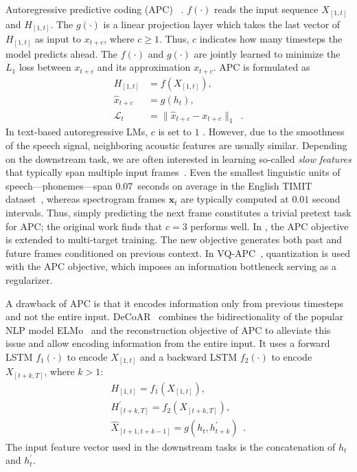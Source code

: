 Autoregressive predictive coding (APC)~\parencite{chung_unsupervised_2019,
chung_generative_2020} .
 $f(\cdot)$ reads the input sequence $X_{[1,t]}$ and  $H_{[1,t]}$.
The  $g(\cdot)$ is a linear projection layer which takes the last vector of $H_{[1,t]}$ as input to  $x_{t+c}$, where $c \geq 1$. Thus, $c$ indicates how many timesteps the model predicts ahead. The  $f(\cdot)$
and $g(\cdot)$ are jointly learned to minimize {the \ensuremath{L_1} loss between $x_{t+c}$ and its approximation $\hat{x}_{t+c}$}. APC is formulated as 
\begin{align}
    H_{[1,t]} &= f(X_{[1,t]}) , \\
    \hat{x}_{t+c} &= g(h_{t}) \label{eq:c} , \\
    \mathcal{L}_t &= \lVert \hat{x}_{t+c} - x_{t+c} \rVert_1 \enspace .
\end{align}
In text-based autoregressive LMs, $c$ is set to $1$ . However, due to the smoothness of the speech signal, neighboring acoustic features are usually similar. Depending on the downstream task, we are often interested in learning so-called \emph{slow features} that typically span multiple input frames~\parencite{wiskott_slow_2002}. Even the smallest linguistic units of speech---phonemes---span $0.07$~seconds on average in the English TIMIT dataset~\parencite{garofolo_timit_1993},   whereas spectrogram frames $\mathbf{x}_t$ are typically computed at $0.01$ second intervals. Thus, simply predicting the next frame constitutes a trivial pretext task for APC; the original work finds that $c=3$ performs well. 
In \parencite{chung_improved_2020}, the APC objective is extended to multi-target
training. The new objective generates both past and future frames conditioned
on previous context. 
In VQ-APC~\parencite{chung_vectorquantized_2020}, quantization is used with the APC
objective, which imposes an information bottleneck serving as a regularizer.

A drawback of APC is that it encodes information only from previous timesteps
and not the entire input.
DeCoAR~\parencite{ling_deep_2020} combines the bidirectionality of the popular NLP model
ELMo~\parencite{peters_deep_2018} and the reconstruction objective of APC to alleviate
this issue and allow encoding information from the entire input. 
It uses a forward LSTM $f_1(\cdot)$ to encode $X_{[1,t]}$ and a backward LSTM
$f_2(\cdot)$ to encode $X_{[t+k,T]}$, where $k>1$: 
\begin{gather}
    H_{[1,t]} = f_1(X_{[1,t]}), \\
    H^\prime_{[t+k,T]} = f_2(X_{[t+k,T]}), \\
    \hat{X}_{[t+1,t+k-1]} = g(h_t, h^\prime_{t+k}) \enspace .
\end{gather}
The input feature vector used in the downstream tasks is the concatenation of
$h_{t}$ and $h^\prime_{t}$. 


